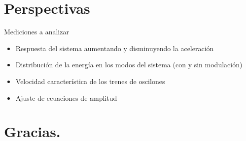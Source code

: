 \documentclass[aspectratio=169]{beamer}
\begin{document}
\section{Perspectivas}
\begin{frame}{Mediciones a analizar}
	\begin{itemize} 
		\item Respuesta del sistema aumentando y disminuyendo la aceleración
			\vspace{0.8cm}
		\item Distribución de la energía en los modos del sistema (con y sin modulación)
			\vspace{0.8cm}
		\item Velocidad característica de los trenes de oscilones
			\vspace{0.8cm}
		\item Ajuste de ecuaciones de amplitud
	\end{itemize}
\end{frame}

\section*{Gracias.}
\end{document}
